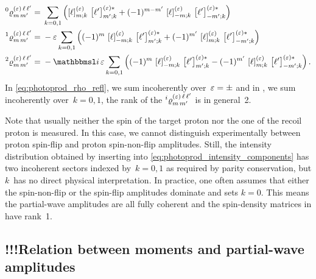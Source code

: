 \begin{align}
  \label{eq:photoprod_rho_0_refl}
  \prescript{0}{}{\varrho}^{(\refl)\, \ell\, \ell'}_{m\, m'}
  ={}& \sum_{k = 0, 1} \rBrk[2]{\sBrk{\ell}^{(\refl)}_{m; k}\, \sBrk{\ell'}^{(\refl) *}_{m'; k}
  + (-1)^{m - m'}\, \sBrk{\ell}^{(\refl)}_{{-m}; k}\, \sBrk{\ell'}^{(\refl) *}_{{-m'}; k}}
  \\
  \label{eq:photoprod_rho_1_refl}
  \prescript{1}{}{\varrho}^{(\refl)\, \ell\, \ell'}_{m\, m'}
  ={}& -\refl \sum_{k = 0, 1} \rBrk[2]{(-1)^m\, \sBrk{\ell}^{(\refl)}_{{-m}; k}\, \sBrk{\ell'}^{(\refl) *}_{m'; k}
  + (-1)^{m'}\, \sBrk{\ell}^{(\refl)}_{m; k}\, \sBrk{\ell'}^{(\refl) *}_{{-m'}; k}}
  \\
  \label{eq:photoprod_rho_2_refl}
  \prescript{2}{}{\varrho}^{(\refl)\, \ell\, \ell'}_{m\, m'}
  ={}& -\imag\, \refl \sum_{k = 0, 1} \rBrk[2]{(-1)^m\, \sBrk{\ell}^{(\refl)}_{{-m}; k}\, \sBrk{\ell'}^{(\refl) *}_{m'; k}
  - (-1)^{m'}\, \sBrk{\ell}^{(\refl)}_{m; k}\, \sBrk{\ell'}^{(\refl) *}_{{-m'}; k}}.
\end{align}
In \cref{eq:photoprod_rho_refl}, we sum incoherently over~$\varepsilon =
\pm$ and in
, we sum
incoherently over~$k = 0, 1$, \ie the rank of the
$\prescript{i}{}{\varrho}^{(\varepsilon)\, \ell\, \ell'}_{m\, m'}$ is in
general~2.

Note that usually neither the spin of the target proton nor the one of
the recoil proton is measured.  In this case, we cannot distinguish
experimentally between proton spin-flip and proton spin-non-flip
amplitudes.  Still, the intensity distribution obtained by inserting
 into
\cref{eq:photoprod_intensity_components} has two incoherent sectors
indexed by~$k = 0, 1$ as required by parity conservation, but $k$~has
no direct physical interpretation.  In practice, one often assumes
that either the spin-non-flip or the spin-flip amplitudes dominate and
sets $k = 0$.  This means the partial-wave amplitudes are all fully
coherent and the spin-density matrices in
 have
rank~1.


\subsection{!!!Relation between moments and partial-wave amplitudes}%

